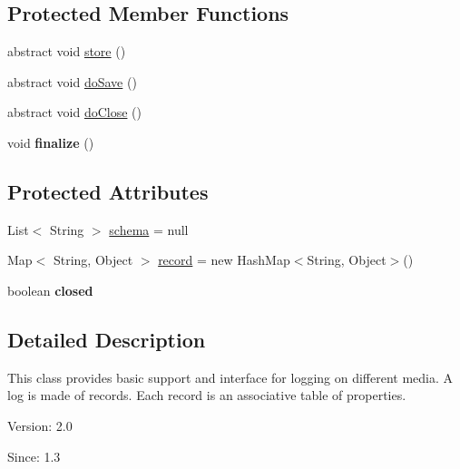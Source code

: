 \subsection*{Protected Member Functions}
\begin{CompactItemize}
\item 
abstract void \hyperlink{classjenes_1_1utils_1_1_abstract_logger_6acf83a83999e26ae4ed45cbf355111b}{store} ()
\item 
abstract void \hyperlink{classjenes_1_1utils_1_1_abstract_logger_41fcd50b050c467fe1b413fc5b49c167}{doSave} ()
\item 
abstract void \hyperlink{classjenes_1_1utils_1_1_abstract_logger_5253672b3f3f81287db2fc604ca921a9}{doClose} ()
\item 
\hypertarget{classjenes_1_1utils_1_1_abstract_logger_f2c45f653c6e5e79bc4e85dc3ecc4ab4}{
void \textbf{finalize} ()}
\label{classjenes_1_1utils_1_1_abstract_logger_f2c45f653c6e5e79bc4e85dc3ecc4ab4}

\end{CompactItemize}
\subsection*{Protected Attributes}
\begin{CompactItemize}
\item 
List$<$ String $>$ \hyperlink{classjenes_1_1utils_1_1_abstract_logger_3a2030876857a0512fae7e0ad400c570}{schema} = null
\item 
Map$<$ String, Object $>$ \hyperlink{classjenes_1_1utils_1_1_abstract_logger_e85e356ad12255a9c5ec8f9f25659ef7}{record} = new HashMap$<$String, Object$>$()
\item 
\hypertarget{classjenes_1_1utils_1_1_abstract_logger_68fe91d1c7bad9146db3bddd92bbcab3}{
boolean \textbf{closed}}
\label{classjenes_1_1utils_1_1_abstract_logger_68fe91d1c7bad9146db3bddd92bbcab3}

\end{CompactItemize}


\subsection{Detailed Description}
This class provides basic support and interface for logging on different media. A log is made of records. Each record is an associative table of properties.

\begin{Desc}
\item[Version:]2.0 \end{Desc}
\begin{Desc}
\item[Since:]1.3 \end{Desc}


